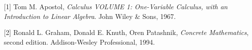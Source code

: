 [1] Tom M. Apostol, {\sl Calculus VOLUME 1: One-Variable Calculus, with
an Introduction to Linear Algebra}.  John Wiley \& Sons, 1967.

[2] Ronald L. Graham, Donald E. Knuth, Oren Patashnik, {\sl Concrete Mathematics},
second edition.  Addison-Wesley Professional, 1994.
